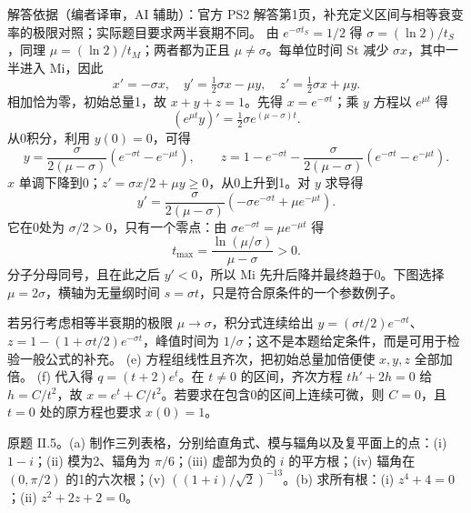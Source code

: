 \begin{solution}
解答依据（编者译审，AI 辅助）：官方 PS2 解答第1页，补充定义区间与相等衰变率的极限对照；实际题目要求两半衰期不同。
由 $e^{-\sigma t_S}=1/2$ 得 $\sigma=(\ln2)/t_S$，同理 $\mu=(\ln2)/t_M$；两者都为正且 $\mu\ne\sigma$。每单位时间 St 减少 $\sigma x$，其中一半进入 Mi，因此
\[
 x'=-\sigma x,\quad y'=\tfrac12\sigma x-\mu y,
 \quad z'=\tfrac12\sigma x+\mu y.
\]
相加恰为零，初始总量1，故 $x+y+z=1$。先得 $x=e^{-\sigma t}$；乘 $y$ 方程以 $e^{\mu t}$ 得
\[
 (e^{\mu t}y)'=\tfrac12\sigma e^{(\mu-\sigma)t}.
\]
从0积分，利用 $y(0)=0$，可得
\[
 y=\frac\sigma{2(\mu-\sigma)}(e^{-\sigma t}-e^{-\mu t}),\qquad
 z=1-e^{-\sigma t}-\frac\sigma{2(\mu-\sigma)}(e^{-\sigma t}-e^{-\mu t}).
\]
$x$ 单调下降到0；$z'=\sigma x/2+\mu y\geq0$，从0上升到1。对 $y$ 求导得
\[
 y'=\frac\sigma{2(\mu-\sigma)}(-\sigma e^{-\sigma t}+\mu e^{-\mu t}).
\]
它在0处为 $\sigma/2>0$，只有一个零点：由 $\sigma e^{-\sigma t}=\mu e^{-\mu t}$ 得
\[
 t_{\max}=\frac{\ln(\mu/\sigma)}{\mu-\sigma}>0.
\]
分子分母同号，且在此之后 $y'<0$，所以 Mi 先升后降并最终趋于0。下图选择 $\mu=2\sigma$，横轴为无量纲时间 $s=\sigma t$，只是符合原条件的一个参数例子。
\begin{center}\end{center}
若另行考虑相等半衰期的极限 $\mu\to\sigma$，积分式连续给出 $y=(\sigma t/2)e^{-\sigma t}$、$z=1-(1+\sigma t/2)e^{-\sigma t}$，峰值时间为 $1/\sigma$；这不是本题给定条件，而是可用于检验一般公式的补充。
(e) 方程组线性且齐次，把初始总量加倍便使 $x,y,z$ 全部加倍。
(f) 代入得 $q=(t+2)e^t$。在 $t\ne0$ 的区间，齐次方程 $th'+2h=0$ 给 $h=C/t^2$，故 $x=e^t+C/t^2$。若要求在包含0的区间上连续可微，则 $C=0$，且 $t=0$ 处的原方程也要求 $x(0)=1$。
\end{solution}
\begin{exercise}\label{cw:ps2-II-5}
原题 II.5。(a) 制作三列表格，分别给直角式、模与辐角以及复平面上的点：(i) $1-i$；(ii) 模为2、辐角为 $\pi/6$；(iii) 虚部为负的 $i$ 的平方根；(iv) 辐角在 $(0,\pi/2)$ 的1的六次根；(v) $((1+i)/\sqrt2)^{-13}$。(b) 求所有根：(i) $z^4+4=0$；(ii) $z^2+2z+2=0$。
\end{exercise}
